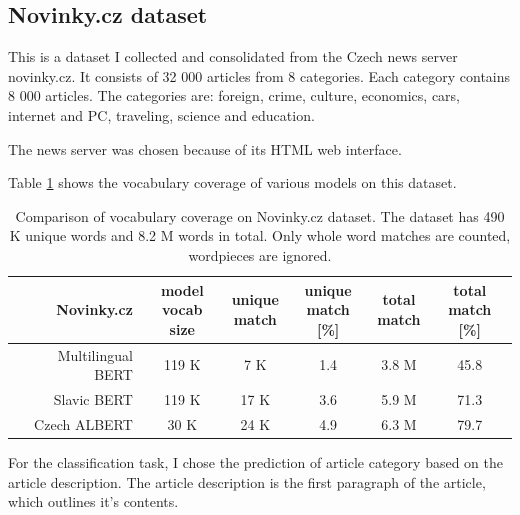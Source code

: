 \documentclass[
  printed, %
  color,   %
  table,   %
  oneside, %
  lof,     %
  lot,     %
]{fithesis3}
\begin{document}
\subsection{Novinky.cz dataset}

This is a dataset I collected and consolidated from the Czech news server novinky.cz. It consists of 32 000 articles from 8 categories. Each category contains 8 000 articles. The categories are: foreign, crime, culture, economics, cars, internet and PC, traveling, science and education.


The news server was chosen because of its HTML web interface.

Table \ref{tab:vocab-nov-compare} shows the vocabulary coverage of various models on this dataset.

\begin{table}[h]
\centering
\small
\begin{tabular}{r|c|c|c|c|c}
        Novinky.cz
        & \rotatebox[origin=l]{90}{\parbox{2.2cm}{model \\ vocab size}} 
        & \rotatebox[origin=l]{90}{\parbox{2cm}{unique \\ match}}
        & \rotatebox[origin=l]{90}{\parbox{2cm}{unique \\ match [\%]}}
        & \rotatebox[origin=l]{90}{\parbox{2cm}{total \\ match}}
        & \rotatebox[origin=l]{90}{\parbox{2cm}{total \\ match [\%]}}
        \\ 
    \toprule
    Multilingual BERT      & 119 K  & 7 K   & 1.4  & 3.8 M   & 45.8 \\
    Slavic BERT            & 119 K  & 17 K  & 3.6  & 5.9 M   & 71.3 \\
    Czech ALBERT           & 30 K   & 24 K  & 4.9  & 6.3 M   & 79.7 \\ 
\end{tabular}
\caption[Vocabulary coverage on Novinky.cz dataset]
{Comparison of vocabulary coverage on Novinky.cz dataset. The dataset has 490 K unique words and 8.2 M words in total. Only whole word matches are counted, wordpieces are ignored.}
\label{tab:vocab-nov-compare}
\end{table} %

For the classification task, I chose the prediction of article category based on the article description. The article description is the first paragraph of the article, which outlines it's contents.
\end{document}
